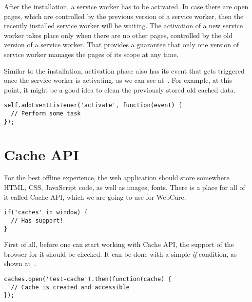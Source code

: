 After the installation, a service worker has to be activated. In case there are open pages, which are controlled by the previous version of a service worker, then the recently installed service worker will be waiting. The activation of a new service worker takes place only when there are no other pages, controlled by the old version of a service worker. That provides a guarantee that only one version of service worker manages the pages of its scope at any time.

Similar to the installation, activation phase also has its event that gets triggered once the service worker is activating, as we can see at~. For example, at this point, it might be a good idea to clean the previously stored old cached data.

\begin{lstlisting}[caption={An example code, which demonstates a listener for the \textit{activation} service worker's event\cite{32}.}, label={lst:tech4}]
self.addEventListener('activate', function(event) {
  // Perform some task
});
\end{lstlisting}

\section{Cache API}

For the best offline experience, the web application should store somewhere HTML, CSS, JavaScript code, as well as images, fonts. There is a place for all of it called Cache API, which we are going to use for WebCure. 

\begin{lstlisting}[caption={An example code, which demonstrates how one can check the support for Cache API\cite{34}.}, label={lst:tech5}]
if('caches' in window) {
  // Has support!
}
\end{lstlisting}

First of all, before one can start working with Cache API, the support of the browser for it should be checked. It can be done with a simple \textit{if} condition, as shown at~.

\begin{lstlisting}[caption={An example code, which demonstrates how one can create cache storage called \textit{test-cache}\cite{34}.}, label={lst:tech6}]
caches.open('test-cache').then(function(cache) {
  // Cache is created and accessible
});
\end{lstlisting}

